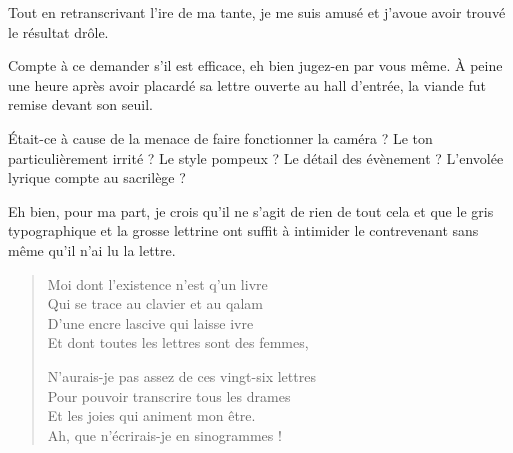 \begin{prose}
Tout en retranscrivant l’ire de ma tante, je me suis amusé et j’avoue avoir trouvé le résultat drôle.

Compte à ce demander s’il est efficace, eh bien jugez-en par vous même. À peine une heure après avoir placardé sa lettre ouverte au hall d’entrée, la viande fut remise devant son seuil.

Était-ce à cause de la menace de faire fonctionner la caméra ? Le ton particulièrement irrité ? Le style pompeux ? Le détail des évènement ? L’envolée lyrique compte au sacrilège ?

Eh bien, pour ma part, je crois qu’il ne s’agit de rien de tout cela et que le gris typographique et la grosse lettrine ont suffit à intimider le contrevenant sans même qu’il n’ai lu la lettre.
\end{prose}

\begin{verse}
Moi dont l’existence n’est q’un livre\\
Qui se trace au clavier et au qalam\\
D’une encre lascive qui laisse ivre\\
Et dont toutes les lettres sont des femmes,

N’aurais-je pas assez de ces vingt-six lettres\\
Pour pouvoir transcrire tous les drames\\
Et les joies  qui animent mon être.\\
Ah, que n’écrirais-je en sinogrammes !
\end{verse}

